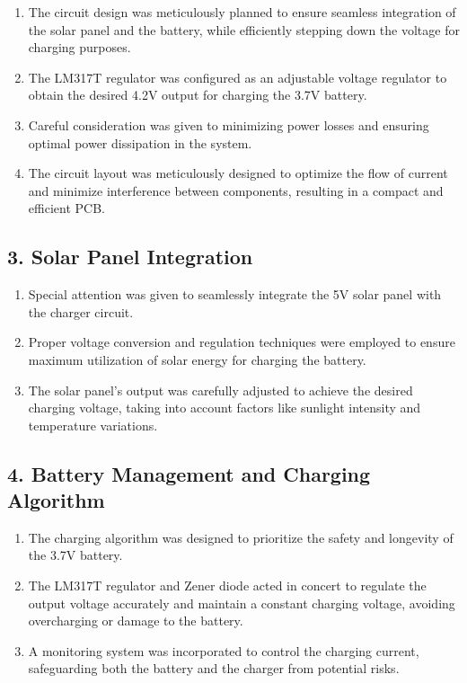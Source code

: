 \documentclass[twocolumn]{article}
\begin{document}
\begin{enumerate}
    \item The circuit design was meticulously planned to ensure seamless integration of the solar panel and the battery, while efficiently stepping down the voltage for charging purposes.
    \item The LM317T regulator was configured as an adjustable voltage regulator to obtain the desired 4.2V output for charging the 3.7V battery.
    \item Careful consideration was given to minimizing power losses and ensuring optimal power dissipation in the system.
    \item The circuit layout was meticulously designed to optimize the flow of current and minimize interference between components, resulting in a compact and efficient PCB.
\end{enumerate}

\subsection*{3. Solar Panel Integration}

\begin{enumerate}
    \item Special attention was given to seamlessly integrate the 5V solar panel with the charger circuit.
    \item Proper voltage conversion and regulation techniques were employed to ensure maximum utilization of solar energy for charging the battery.
    \item The solar panel's output was carefully adjusted to achieve the desired charging voltage, taking into account factors like sunlight intensity and temperature variations.
\end{enumerate}

\subsection*{4. Battery Management and Charging Algorithm}

\begin{enumerate}
    \item The charging algorithm was designed to prioritize the safety and longevity of the 3.7V battery.
    \item The LM317T regulator and Zener diode acted in concert to regulate the output voltage accurately and maintain a constant charging voltage, avoiding overcharging or damage to the battery.
    \item A monitoring system was incorporated to control the charging current, safeguarding both the battery and the charger from potential risks.
\end{enumerate}
  
\end{document}
